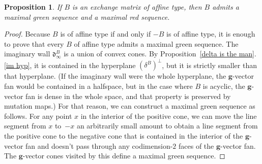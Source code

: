 \documentclass{amsart}
\newtheorem{proposition}{Proposition}[section]
\theoremstyle{definition}
\theoremstyle{remark}
\numberwithin{equation}{section}
\newcommand{\0}{{\mathbf{0}}}
\newcommand{\g}{\mathbf{g}}
\renewcommand{\d}{{\mathfrak d}}
\begin{document}
\begin{proposition}\label{aff red}
If $B$ is an exchange matrix of affine type, then $B$ admits a maximal green sequence and a maximal red sequence.
\end{proposition}
\begin{proof}  
Because $B$ is of affine type if and only if $-B$ is of affine type, it is enough to prove that every $B$ of affine type admits a maximal green sequence.
The imaginary wall $\d^B_\infty$ is a union of convex cones.
By Proposition~\ref{delta is the man}.\ref{im hyp}, it is contained in the hyperplane $(\delta^B)^\perp$, but it is strictly smaller than that hyperplane.
(If the imaginary wall were the whole hyperplane, the $\g$-vector fan would be contained in a halfspace, but in the case where $B$ is acyclic, the $\g$-vector fan is dense in the whole space, and that property is preserved by mutation maps.) 
For that reason, we can construct a maximal green sequence as follows.
For any point $x$ in the interior of the positive cone, we can move the line segment from $x$ to~$-x$ an arbitrarily small amount to obtain a line segment from the positive cone to the negative cone that is contained in the interior of the $\g$-vector fan and doesn't pass through any codimension-$2$ faces of the $\g$-vector fan.
The $\g$-vector cones visited by this define a maximal green sequence.
\end{proof}
\end{document}

